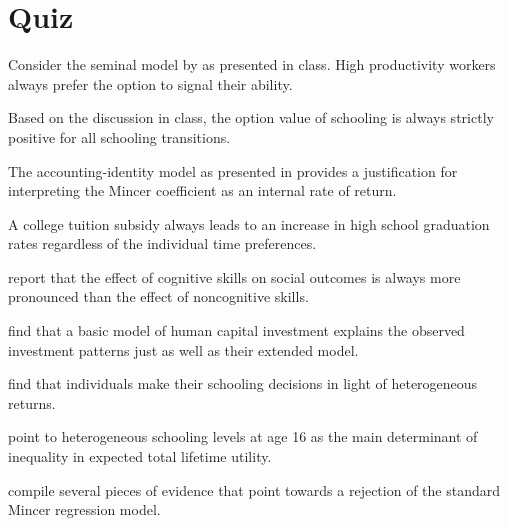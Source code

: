 \FloatBarrier\section{Quiz}
\begin{boenumerate}
\item Consider the seminal model by \cite{Spence.1973} as presented in class. High productivity workers always prefer the option to signal their ability.

\item Based on the discussion in class, the option value of schooling is always strictly positive for all schooling transitions.

\item The accounting-identity model as presented in \cite{Heckman.2006a} provides a justification for interpreting the Mincer coefficient as an internal rate of return.

\item A college tuition subsidy always leads to an increase in high school graduation rates regardless of the individual time preferences.

\item \cite{Heckman.2006b} report that the effect of cognitive skills on social outcomes is always more pronounced than the effect of noncognitive skills.

\item \cite{Keane.1997} find that a basic model of human capital investment explains the observed investment patterns just as well as their extended model.

\item \cite{Carneiro.2011} find that individuals make their schooling decisions in light of heterogeneous returns.

\item \cite{Keane.1997} point to heterogeneous schooling levels at age 16 as the main determinant of inequality in expected total lifetime utility.

\item \cite{Heckman.2006a} compile several pieces of evidence that point towards a rejection of the standard Mincer regression model.


\end{boenumerate}
